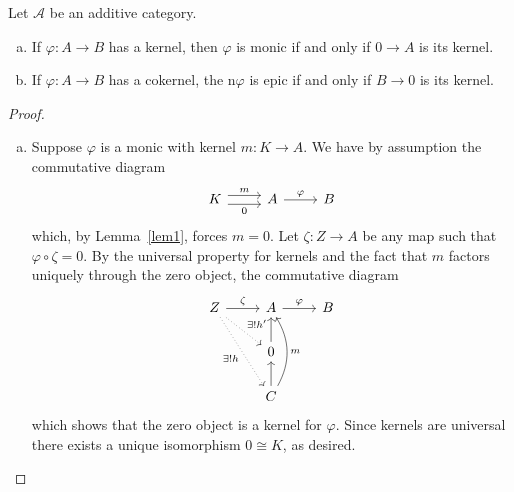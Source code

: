 \documentclass[10pt]{amsart}
\begin{document}
\begin{lem}\label{lem3}
  Let $\mathcal{A}$ be an additive category.
  \begin{enumerate}[(a)]
  \item
    If $\varphi : A \rightarrow B$ has a kernel, then $\varphi$ is monic if and only if $0 \rightarrow A$ is its kernel.
  \item
    If $\varphi : A \rightarrow B$ has a cokernel, the n$\varphi$ is epic if and only if $B \rightarrow 0$ is its kernel.
  \end{enumerate}

  \begin{proof}
    \begin{enumerate}[(a)]
    \item
      Suppose $\varphi$ is a monic with kernel $m : K \rightarrow A$.
      We have by assumption the commutative diagram
      $$\begin{tikzcd}
	K \arrow[shift left = 0.75ex]{r}{m} \arrow[shift right=0.75ex, swap]{r}{0}& A\arrow{r}{\varphi} & B
      \end{tikzcd}$$
      which, by Lemma~\ref{lem1}, forces $m = 0$.
      Let $\zeta : Z \rightarrow A$ be any map such that $\varphi \circ \zeta = 0$.
      By the universal property for kernels and the fact that $m$ factors uniquely through the zero object, the commutative diagram
      $$\begin{tikzcd}
	Z \arrow[dotted]{rd}{\exists ! h^\prime}\arrow[dotted,swap]{rdd}{\exists ! h} \arrow{r}{\zeta} & A \arrow{r}{\varphi} & B\\
	& 0 \arrow{u}\\
	& C \arrow{u} \arrow[bend right,swap]{uu}{m}
      \end{tikzcd}$$
      which shows that the zero object is a kernel for $\varphi$.
      Since kernels are universal there exists a unique isomorphism $0 \cong K$, as desired.
      

\end{enumerate}
\end{proof}
\end{lem}
\end{document}
